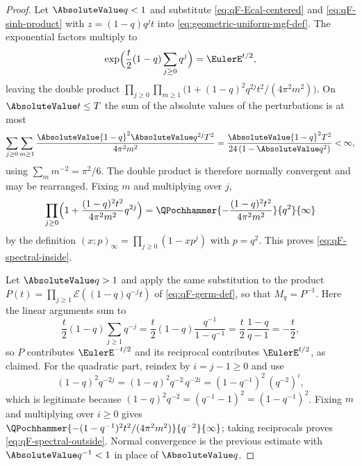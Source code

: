 \documentclass[11pt,a4paper,oneside,openany]{book}
\theoremstyle{definition}
\theoremstyle{remark}
\begin{document}
\begin{proof}
Let $\AbsoluteValue q<1$ and substitute \eqref{eq:qF-Ecal-centered} and
\eqref{eq:qF-sinh-product} with $z=(1-q)q^jt$ into \eqref{eq:geometric-uniform-mgf-def}.  The
exponential factors multiply to
\[
 \exp\Bigl(\frac t2(1-q)\sum_{j\ge0}q^{j}\Bigr)=\EulerE^{t/2},
\]
leaving the double product
$\prod_{j\ge0}\prod_{m\ge1}\bigl(1+(1-q)^2q^{2j}t^2/(4\pi^2m^2)\bigr)$.  On
$\AbsoluteValue t\le T$ the sum of the absolute values of the perturbations is at most
\[
 \sum_{j\ge0}\sum_{m\ge1}\frac{\AbsoluteValue{1-q}^2\AbsoluteValue q^{2j}T^2}{4\pi^2m^2}
 =\frac{\AbsoluteValue{1-q}^2T^2}{24\,(1-\AbsoluteValue q^2)}<\infty,
\]
using $\sum_mm^{-2}=\pi^2/6$.  The double product is therefore normally
convergent and may be rearranged.  Fixing $m$ and multiplying over $j$,
\[
 \prod_{j\ge0}\Bigl(1+\frac{(1-q)^2t^2}{4\pi^2m^2}q^{2j}\Bigr)
 =\QPochhammer{-\dfrac{(1-q)^2t^2}{4\pi^2m^2}}{q^{2}}{\infty}
\]
by the definition $(x;p)_\infty=\prod_{j\ge0}(1-xp^j)$ with $p=q^2$.  This proves
\eqref{eq:qF-spectral-inside}.

Let $\AbsoluteValue q>1$ and apply the same substitution to the product
$P(t)=\prod_{j\ge1}\mathcal E((1-q)q^{-j}t)$ of \eqref{eq:qF-germ-def}, so that
$M_q=P^{-1}$.  Here the linear arguments sum to
\[
 \frac t2(1-q)\sum_{j\ge1}q^{-j}
 =\frac t2(1-q)\frac{q^{-1}}{1-q^{-1}}
 =\frac t2\,\frac{1-q}{q-1}
 =-\frac t2,
\]
so $P$ contributes $\EulerE^{-t/2}$ and its reciprocal contributes $\EulerE^{t/2}$, as
claimed.  For the quadratic part, reindex by $i=j-1\ge0$ and use
\[
 (1-q)^2q^{-2j}=(1-q)^2q^{-2}\,q^{-2i}=(1-q^{-1})^2\,(q^{-2})^{i},
\]
which is legitimate because $(1-q)^2q^{-2}=(q^{-1}-1)^2=(1-q^{-1})^2$.  Fixing
$m$ and multiplying over $i\ge0$ gives
$\QPochhammer{-(1-q^{-1})^2t^2/(4\pi^2m^2)}{q^{-2}}{\infty}$; taking reciprocals proves
\eqref{eq:qF-spectral-outside}.  Normal convergence is the previous estimate
with $\AbsoluteValue q^{-1}<1$ in place of $\AbsoluteValue q$.
\end{proof}
\end{document}
